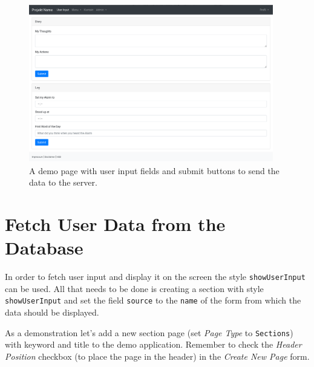 \documentclass[a4paper,oneside]{book}
\begin{document}
\begin{figure}[ht]
    \centering
    \includegraphics[width=0.95\textwidth]{form_empty.png}
    \caption{A demo page with user input fields and submit buttons to send the data to the server.}
    \label{fig.form-empty}
\end{figure}

\section{Fetch User Data from the Database}

In order to fetch user input and display it on the screen the style \texttt{showUserInput} can be used.
All that needs to be done is creating a section with style \texttt{showUserInput} and set the field \texttt{source} to the \texttt{name} of the form from which the data should be displayed.

As a demonstration let's add a new section page (set \emph{Page Type} to \texttt{Sections}) with keyword  and title  to the demo application.
Remember to check the \emph{Header Position} checkbox (to place the page in the header) in the \emph{Create New Page} form.
\end{document}
